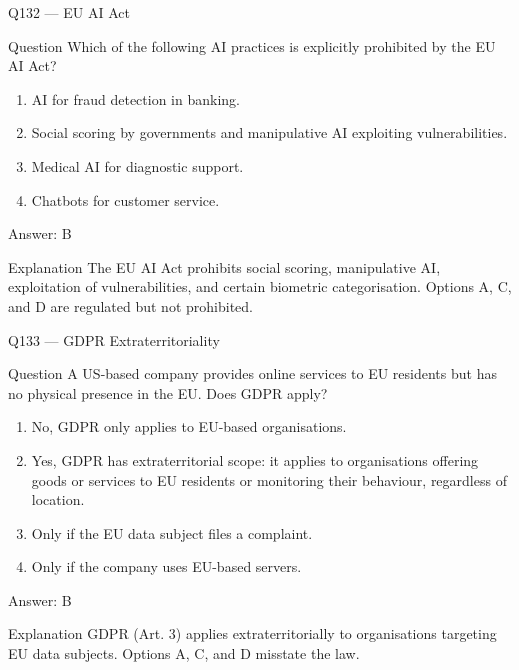 \documentclass[aspectratio=169,8pt]{beamer}
\begin{document}
\begin{frame}{Q132 --- EU AI Act}
\begin{block}{Question}
Which of the following AI practices is explicitly prohibited by the EU AI Act?
\begin{enumerate}
\item AI for fraud detection in banking.
\item Social scoring by governments and manipulative AI exploiting vulnerabilities.
\item Medical AI for diagnostic support.
\item Chatbots for customer service.
\end{enumerate}
	\end{block}
\begin{exampleblock}{Answer: B}\end{exampleblock}
\begin{block}{Explanation}
The EU AI Act prohibits social scoring, manipulative AI, exploitation of vulnerabilities, and certain biometric categorisation. Options A, C, and D are regulated but not prohibited.
\end{block}
\end{frame}

\begin{frame}{Q133 --- GDPR Extraterritoriality}
\begin{block}{Question}
A US-based company provides online services to EU residents but has no physical presence in the EU. Does GDPR apply?
\begin{enumerate}
\item No, GDPR only applies to EU-based organisations.
\item Yes, GDPR has extraterritorial scope: it applies to organisations offering goods or services to EU residents or monitoring their behaviour, regardless of location.
\item Only if the EU data subject files a complaint.
\item Only if the company uses EU-based servers.
\end{enumerate}
	\end{block}
\begin{exampleblock}{Answer: B}\end{exampleblock}
\begin{block}{Explanation}
GDPR (Art. 3) applies extraterritorially to organisations targeting EU data subjects. Options A, C, and D misstate the law.
\end{block}
\end{frame}
\end{document}
